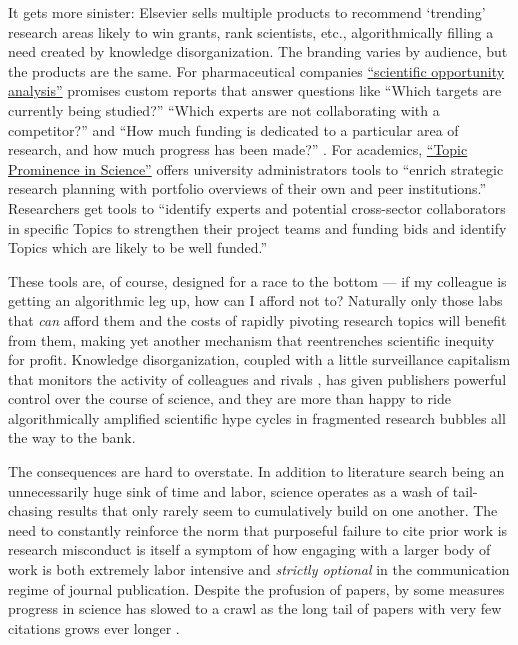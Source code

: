 \documentclass[10pt]{tufte-book}
\begin{document}
It gets more sinister: Elsevier sells multiple products to recommend
`trending' research areas likely to win grants, rank scientists, etc.,
algorithmically filling a need created by knowledge disorganization. The
branding varies by audience, but the products are the same. For
pharmaceutical companies
\href{https://www.elsevier.com/solutions/professional-services/drug-design-optimization\#opportunity}{``scientific
opportunity analysis''} promises custom reports that answer questions
like ``Which targets are currently being studied?'' ``Which experts are
not collaborating with a competitor?'' and ``How much funding is
dedicated to a particular area of research, and how much progress has
been made?'' \citep{elsevierDrugDesignOptimization} . For
academics,
\href{https://www.elsevier.com/solutions/scival/features/topic-prominence-in-science\#how}{``Topic
Prominence in Science''} offers university administrators tools to
``enrich strategic research planning with portfolio overviews of their
own and peer institutions.'' Researchers get tools to ``identify experts
and potential cross-sector collaborators in specific Topics to
strengthen their project teams and funding bids and identify Topics
which are likely to be well funded.'' \citep{elsevierTopicProminenceScienceb} 

These tools are, of course, designed for a race to the bottom --- if my
colleague is getting an algorithmic leg up, how can I afford not to?
Naturally only those labs that \emph{can} afford them and the costs of
rapidly pivoting research topics will benefit from them, making yet
another mechanism that reentrenches scientific inequity for profit.
Knowledge disorganization, coupled with a little surveillance capitalism
that monitors the activity of colleagues and rivals \citep{brembsReplacingAcademicJournals2021} , has given publishers powerful
control over the course of science, and they are more than happy to ride
algorithmically amplified scientific hype cycles in fragmented research
bubbles all the way to the bank.

The consequences are hard to overstate. In addition to literature search
being an unnecessarily huge sink of time and labor, science operates as
a wash of tail-chasing results that only rarely seem to cumulatively
build on one another. The need to constantly reinforce the norm that
purposeful failure to cite prior work is research misconduct is itself a
symptom of how engaging with a larger body of work is both extremely
labor intensive and \emph{strictly optional} in the communication regime
of journal publication. Despite the profusion of papers, by some
measures progress in science has slowed to a crawl as the long tail of
papers with very few citations grows ever longer \citep{chuSlowedCanonicalProgress2021} .
\end{document}
